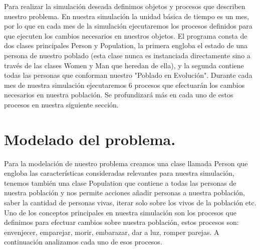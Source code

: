 \documentclass[12pt]{article}
\begin{document}
Para realizar la simulaci\'on deseada definimos objetos y procesos que describen nuestro problema.
En nuestra simulaci\'on la unidad b\'asica de tiempo es un mes, por lo que en cada mes de la simulaci\'on ejecutaremos
los procesos definidos para que ejecuten los cambios necesarios en nuestros objetos. El programa consta de dos clases principales
Person y Population, la primera engloba el estado de una persona de nuestro poblado (esta clase nunca es instanciada directamente sino a trav\'es de las clases Women y Man que heredan de ella), y la segunda contiene todas las personas que conforman
nuestro "Poblado en Evoluci\'on". Durante cada mes de nuestra simulaci\'on ejecutaremos 6 procesos que efectuar\'an los cambios necesarios en nuestra poblaci\'on.
Se profundizar\'a m\'as en cada uno de estos procesos en nuestra siguiente secci\'on.


\section{Modelado del problema.}
Para la modelaci\'on de nuestro problema creamos una clase llamada Person que engloba las caracter\'isticas consideradas relevantes para 
nuestra simulaci\'on, tenemos tambi\'en una clase Population que contiene a todas las personas de nuestra poblaci\'on y nos permite acciones a\~nadir personas
a nuestra poblaci\'on, saber la cantidad de personas vivas, iterar solo sobre los vivos de la poblaci\'on etc.
\newline
Uno de los conceptos principales en nuestra simulaci\'on son los procesos que definimos para efectuar cambios sobre nuestra poblaci\'on, estos
procesos son: envenjecer, emparejar, morir, embarazar, dar a luz, romper parejas. A continuaci\'on analizamos cada uno de esos procesos.
\end{document}
